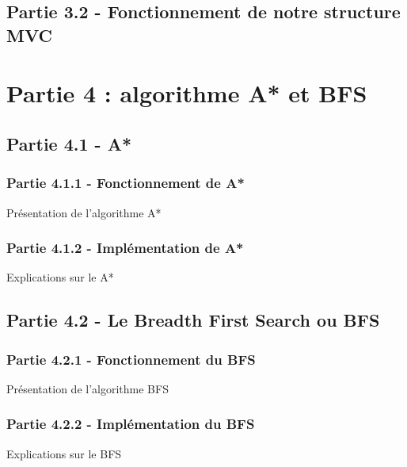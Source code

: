\documentclass{beamer} %
\begin{document}
	\subsection{Partie 3.2 - Fonctionnement de notre structure MVC}
\begin{frame}[plain]
\end{frame}

\section{Partie 4 : algorithme A* et BFS}
	\subsection{Partie 4.1 - A*}
		\subsubsection{Partie 4.1.1 - Fonctionnement de A*}
\begin{frame}[plain]
Présentation de l'algorithme A*
\end{frame}
		\subsubsection{Partie 4.1.2 - Implémentation de A*}
\begin{frame}[plain]
Explications sur le A*
\end{frame}

	\subsection{Partie 4.2 - Le Breadth First Search ou BFS}
		\subsubsection{Partie 4.2.1 - Fonctionnement du BFS}
\begin{frame}[plain]
Présentation de l'algorithme BFS
\end{frame}
		\subsubsection{Partie 4.2.2 - Implémentation du BFS}
\begin{frame}[plain]
Explications sur le BFS
\end{frame}
\end{document}
